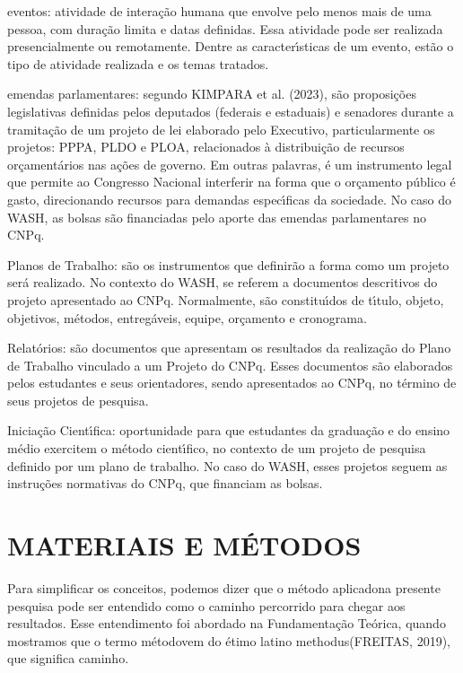 \documentclass[
12pt,		%
openright,	%
twoside,  %
a4paper,			%
chapter=TITLE,		%
english,			%
french,				%
spanish,			%
brazil				%
]{USPSC-classe/USPSC}
\begin{document}
\begin{alineas}
\item eventos: atividade de intera\c{c}\~ao humana que envolve pelo menos mais de uma pessoa, com dura\c{c}\~ao limita e datas definidas. Essa atividade pode ser realizada presencialmente ou remotamente. Dentre as caracter\'{\i}sticas de um evento, est\~ao o tipo de atividade realizada e os temas tratados.
\item emendas parlamentares: segundo  KIMPARA et al. (2023),  \textquotedbl s\~ao proposi\c{c}\~oes legislativas definidas pelos deputados (federais e estaduais) e senadores durante a tramita\c{c}\~ao de um projeto de lei elaborado pelo Executivo, particularmente os projetos: PPPA, PLDO e PLOA\textquotedbl , relacionados \`a distribui\c{c}\~ao de recursos or\c{c}ament\'arios nas a\c{c}\~oes de governo. Em outras palavras, \'e um instrumento legal que permite ao Congresso Nacional interferir na forma que o or\c{c}amento p\'ublico \'e gasto, direcionando recursos para demandas espec\'{\i}ficas da sociedade. No caso do WASH, as bolsas s\~ao financiadas pelo aporte das emendas parlamentares no CNPq.
\item Planos de Trabalho: s\~ao os instrumentos que definir\~ao a forma como um projeto ser\'a realizado. No contexto do WASH, se referem a documentos descritivos do projeto apresentado ao CNPq. Normalmente, s\~ao constitu\'{\i}dos de t\'{\i}tulo, objeto, objetivos, m\'etodos, entreg\'aveis, equipe, or\c{c}amento e cronograma.
\item Relat\'orios: s\~ao documentos que apresentam os resultados da realiza\c{c}\~ao do Plano de Trabalho vinculado a um Projeto do CNPq. Esses documentos s\~ao elaborados pelos estudantes e seus orientadores, sendo apresentados ao CNPq, no t\'ermino de seus projetos de pesquisa.
\item Inicia\c{c}\~ao Cient\'{\i}fica: oportunidade para que estudantes da gradua\c{c}\~ao e do ensino m\'edio exercitem o m\'etodo cient\'{\i}fico, no contexto de um projeto de pesquisa definido por um plano de trabalho. No caso do WASH, esses projetos seguem as instru\c{c}\~oes normativas do CNPq, que financiam as bolsas.
\end{alineas}

\chapter[MATERIAIS E M\'ETODOS]{MATERIAIS E M\'ETODOS}\label{MATERIAIS E M\'ETODOS}
Para simplificar os conceitos, podemos dizer que o \textquotedbl m\'etodo aplicado\textquotedbl  na presente pesquisa pode ser entendido como o \textquotedbl caminho percorrido \textquotedbl  para chegar aos resultados. Esse entendimento  foi abordado  na Fundamenta\c{c}\~ao Te\'orica, quando mostramos que o termo \textquotedbl m\'etodo\textquotedbl  vem do \'etimo latino \textquotedbl methodus\textquotedbl   (FREITAS, 2019), que significa \textquotedbl caminho\textquotedbl .
\end{document}
